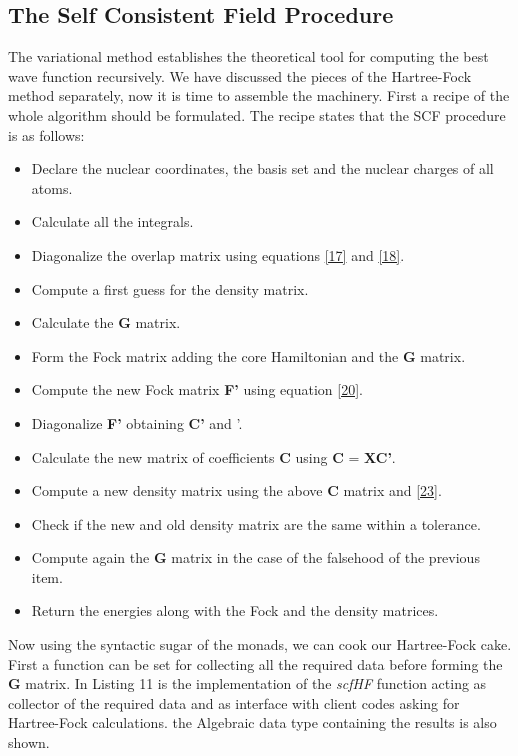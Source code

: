 \documentclass{tmr}
\begin{document}
\subsection{The Self Consistent Field Procedure}

The variational method establishes the theoretical tool for computing the best
wave function recursively. We have discussed the pieces of the Hartree-Fock
method separately, now it is time to assemble the machinery. First a recipe of the 
whole algorithm should be formulated. The recipe states that the SCF procedure is 
as follows:
  
\begin{itemize}
\item Declare the nuclear coordinates, the basis set and the nuclear
charges of all atoms.
\item Calculate all the integrals.
\item Diagonalize the overlap matrix using equations \eqref{17} and \eqref{18}.
\item Compute a first guess for the density matrix.
\item Calculate the \textbf{G} matrix.
\item Form the Fock matrix adding the core Hamiltonian and the \textbf{G} matrix.
\item Compute the new Fock matrix \textbf{F'} using equation \eqref{20}.
\item Diagonalize \textbf{F'} obtaining \textbf{C'} and \textepsilon'.
\item Calculate the new matrix of coefficients \textbf{C} using \textbf{C} = \textbf{XC'}.  
\item Compute a new density matrix using the above \textbf{C} matrix and \eqref{23}.
\item Check if the new and old density matrix are the same within a tolerance.
\item Compute again the \textbf{G} matrix in the case of the falsehood of the previous item. 
\item Return the energies along with the Fock and the density matrices.
\end{itemize}

Now using the syntactic sugar of the monads, we can cook our Hartree-Fock cake. First 
a function can be set for collecting all the required data before forming the 
\textbf{G} matrix. In Listing 11 is the implementation of the \textit{scfHF} function acting
as collector of the required data and as interface with client codes asking
for Hartree-Fock calculations. the Algebraic data type containing the results 
is also shown.
\end{document}
